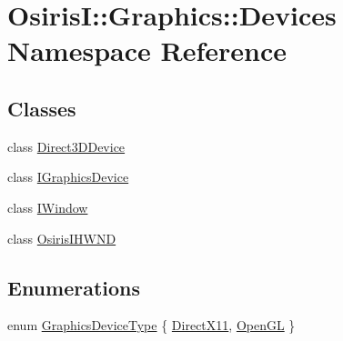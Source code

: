 \hypertarget{namespace_osiris_i_1_1_graphics_1_1_devices}{\section{Osiris\-I\-:\-:Graphics\-:\-:Devices Namespace Reference}
\label{namespace_osiris_i_1_1_graphics_1_1_devices}
}
\subsection*{Classes}
\begin{DoxyCompactItemize}
\item 
class \hyperlink{class_osiris_i_1_1_graphics_1_1_devices_1_1_direct3_d_device}{Direct3\-D\-Device}
\item 
class \hyperlink{class_osiris_i_1_1_graphics_1_1_devices_1_1_i_graphics_device}{I\-Graphics\-Device}
\item 
class \hyperlink{class_osiris_i_1_1_graphics_1_1_devices_1_1_i_window}{I\-Window}
\item 
class \hyperlink{class_osiris_i_1_1_graphics_1_1_devices_1_1_osiris_i_h_w_n_d}{Osiris\-I\-H\-W\-N\-D}
\end{DoxyCompactItemize}
\subsection*{Enumerations}
\begin{DoxyCompactItemize}
\item 
enum \hyperlink{namespace_osiris_i_1_1_graphics_1_1_devices_a6d815f0b8bccde3467ccf09f1f69e334}{Graphics\-Device\-Type} \{ \hyperlink{namespace_osiris_i_1_1_graphics_1_1_devices_a6d815f0b8bccde3467ccf09f1f69e334a49c304a679661e6eea8125080828e33d}{Direct\-X11}, 
\hyperlink{namespace_osiris_i_1_1_graphics_1_1_devices_a6d815f0b8bccde3467ccf09f1f69e334a125b2e4d7fd767a03e6097730ad1e7db}{Open\-G\-L}
 \}
\end{DoxyCompactItemize}


